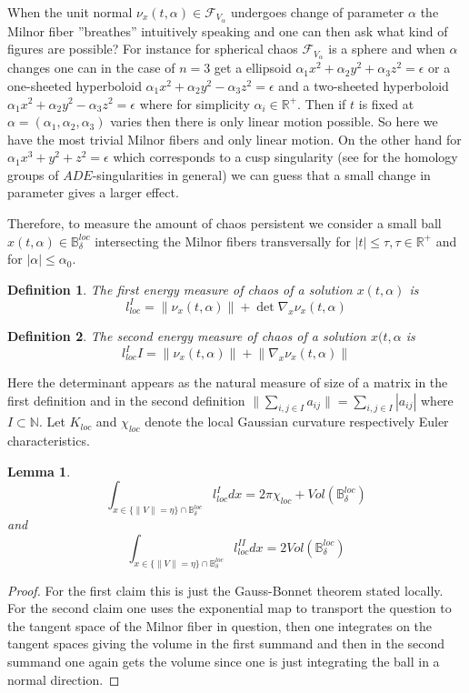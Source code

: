 \documentclass[10pt,a4paper]{amsart}
\newtheorem{lemma}{Lemma}[theorem]
\newtheorem{definition}{Definition}
\begin{document}
When the unit normal $\nu_x(t, \alpha)\in \mathcal{F}_{V_{\alpha}}$ undergoes change of parameter $\alpha$ the Milnor fiber ''breathes'' intuitively speaking and one can then ask what kind of figures are possible? For instance for spherical chaos $\mathcal{F}_{V_{\alpha}}$ is a sphere and when $\alpha$ changes one can in the case of $n=3$ get a ellipsoid $\alpha_1x^2+\alpha_2y^2+\alpha_3 z^2=\epsilon$ or a one-sheeted hyperboloid $\alpha_1x^2+\alpha_2y^2-\alpha_3 z^2=\epsilon$ and a two-sheeted hyperboloid $\alpha_1x^2+\alpha_2y^2-\alpha_3 z^2=\epsilon$ where for simplicity $\alpha_i\in \mathbb{R}^+.$
Then if $t$ is fixed at $\alpha=(\alpha_1, \alpha_2, \alpha_3)$ varies then there is only linear motion possible. So here we have the most trivial Milnor fibers and only linear motion. On the other hand for $\alpha_1 x^3+y^2+z^2=\epsilon$ which corresponds to a cusp singularity (see \cite{LarsI, LarsII} for the homology groups of $ADE$-singularities in general) we can guess that a small change in parameter gives a larger effect. 

Therefore, to measure the amount of chaos persistent we consider a small ball $x(t,\alpha)\in \mathbb{B}_{\delta}^{loc}$ intersecting the Milnor fibers transversally for $|t|\leq\tau, \tau\in\mathbb{R}^+$ and for $|\alpha|\leq \alpha_0$. 

\begin{definition}
    The first energy measure of chaos of a solution $x(t,\alpha)$ is
    $$l_{loc}^I=\lVert \nu_x(t, \alpha) \rVert +\det \nabla_x \nu_x(t, \alpha) $$
\end{definition}

\begin{definition}
    The second energy measure of chaos of a solution $x(t, \alpha$ is 
    $$l_{loc}^II=\lVert \nu_x (t, \alpha)\rVert+ \lVert \nabla_x \nu_x(t, \alpha)\rVert $$
\end{definition}

Here the determinant appears as the natural measure of size of a matrix in the first definition and in the second definition $\lVert \sum_{i,j\in I} a_{ij}\rVert = \sum_{i,j\in I} |a_{ij}|$ where $I\subset \mathbb{N}.$ Let $K_{loc}$ and $\chi_{loc}$ denote the local Gaussian curvature respectively Euler characteristics.

\begin{lemma}
    $$\int_{x\in \{\lVert V\rVert=\eta\}\cap \mathbb{B}_{\delta}^{loc}} l_{loc}^I dx =2\pi\chi_{loc}+Vol(\mathbb{B}_{\delta}^{loc})$$
    and 
    $$\int_{x\in \{\lVert V\rVert=\eta\}\cap \mathbb{B}_{\delta}^{loc}} l_{loc}^{II} dx =2Vol(\mathbb{B}_{\delta}^{loc})$$
\end{lemma}
\begin{proof}
    For the first claim this is just the Gauss-Bonnet theorem stated locally. For the second claim one uses the exponential map to transport the question to the tangent space of the Milnor fiber in question, then one integrates on the tangent spaces giving the volume in the first summand and then in the second summand one again gets the volume since one is just integrating the ball in a normal direction.
\end{proof}
\end{document}
